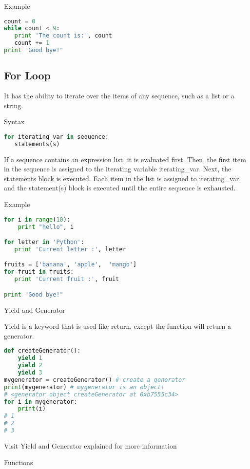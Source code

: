 Example

\begin{lstlisting}[language=Python]
count = 0
while count < 9:
   print 'The count is:', count
   count += 1
print "Good bye!"
\end{lstlisting}


\subsection{For Loop}

It has the ability to iterate over the items of any sequence, such as a list or a string.

Syntax

\begin{lstlisting}[language=Python]
for iterating_var in sequence:
   statements(s)
\end{lstlisting}

If a sequence contains an expression list, it is evaluated first. Then, the first item in the sequence is assigned to the iterating variable iterating_var. Next, the statements block is executed. Each item in the list is assigned to iterating_var, and the statement(s) block is executed until the entire sequence is exhausted.

Example

\begin{lstlisting}[language=Python]
for i in range(10):
    print "hello", i

for letter in 'Python':
   print 'Current letter :', letter

fruits = ['banana', 'apple',  'mango']
for fruit in fruits:
   print 'Current fruit :', fruit

print "Good bye!"
\end{lstlisting}

Yield and Generator

Yield is a keyword that is used like return, except the function will return a generator.

\begin{lstlisting}[language=Python]
def createGenerator():
    yield 1
    yield 2
    yield 3
mygenerator = createGenerator() # create a generator
print(mygenerator) # mygenerator is an object!
# <generator object createGenerator at 0xb7555c34>
for i in mygenerator:
    print(i)
# 1
# 2
# 3
\end{lstlisting}


Visit Yield and Generator explained for more information

Functions

